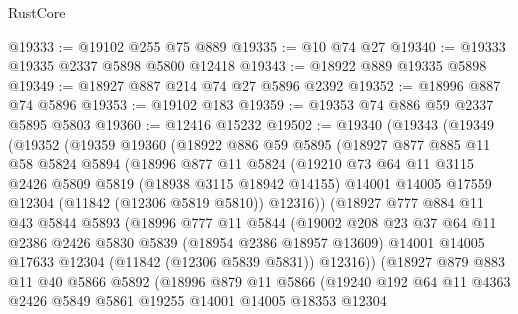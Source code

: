 \begin{lexlean}{RustCore}
\begin{coremodule}
@19333 := @19102 @255 @75 @889
@19335 := @10 @74 @27
@19340 := @19333 @19335 @2337 @5898 @5800 @12418
@19343 := @18922 @889 @19335 @5898
@19349 := @18927 @887 @214 @74 @27 @5896 @2392
@19352 := @18996 @887 @74 @5896
@19353 := @19102 @183
@19359 := @19353 @74 @886 @59 @2337 @5895 @5803
@19360 := @12416 @15232
@19502 := @19340
    (@19343
      (@19349
        (@19352
          (@19359
            @19360
            (@18922
              @886
              @59
              @5895
              (@18927
                @877
                @885
                @11
                @58
                @5824
                @5894
                (@18996
                  @877
                  @11
                  @5824
                  (@19210
                    @73
                    @64
                    @11
                    @3115
                    @2426
                    @5809
                    @5819
                    (@18938 @3115 @18942 @14155)
                    @14001
                    @14005
                    @17559
                    @12304
                    (@11842 (@12306 @5819 @5810))
                    @12316))
                (@18927
                  @777
                  @884
                  @11
                  @43
                  @5844
                  @5893
                  (@18996
                    @777
                    @11
                    @5844
                    (@19002
                      @208
                      @23
                      @37
                      @64
                      @11
                      @2386
                      @2426
                      @5830
                      @5839
                      (@18954 @2386 @18957 @13609)
                      @14001
                      @14005
                      @17633
                      @12304
                      (@11842 (@12306 @5839 @5831))
                      @12316))
                  (@18927
                    @879
                    @883
                    @11
                    @40
                    @5866
                    @5892
                    (@18996
                      @879
                      @11
                      @5866
                      (@19240
                        @192
                        @64
                        @11
                        @4363
                        @2426
                        @5849
                        @5861
                        @19255
                        @14001
                        @14005
                        @18353
                        @12304

\end{coremodule}
\end{lexlean}
